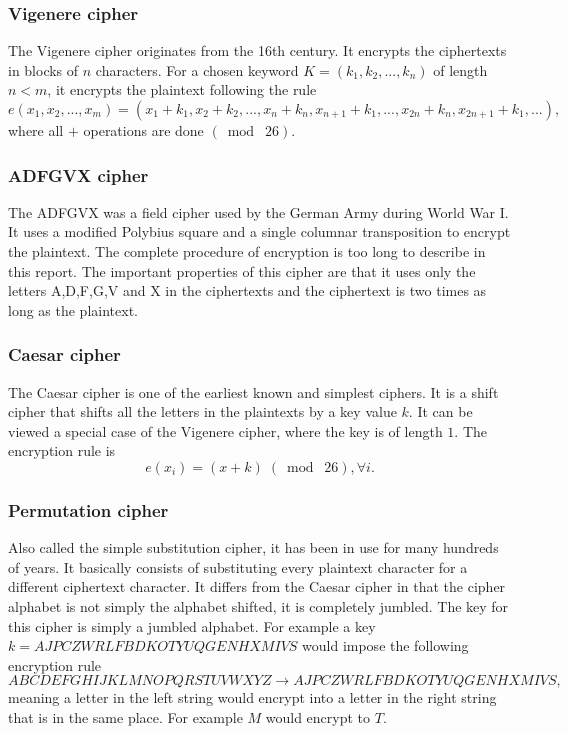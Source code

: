 \documentclass[a4paper]{article}
\begin{document}

\subsubsection{Vigenere cipher}
The Vigenere cipher originates from the 16th century. It encrypts the ciphertexts in blocks of $n$ characters. For a chosen keyword $K = (k_{1}, k_{2}, ..., k_{n})$ of length $n < m$, it encrypts the plaintext following the rule
$$e(x_{1}, x_{2}, ...,x_{m}) = (x_{1}+k_{1}, x_{2}+k_{2}, ..., x_{n}+k_{n}, x_{n+1}+k_{1}, ...,x_{2n}+k_{n}, x_{2n+1} + k_{1}, ...),$$
where all $+$ operations are done $(\bmod\; 26)$.

\subsubsection{ADFGVX cipher}
The ADFGVX was a field cipher used by the German Army during World War I. It uses a modified Polybius square and a single columnar transposition to encrypt the plaintext. The complete procedure of encryption is too long to describe in this report. The important properties of this cipher are that it uses only the letters A,D,F,G,V and X in the ciphertexts and the ciphertext is two times as long as the plaintext. 

\subsubsection{Caesar cipher}
The Caesar cipher is one of the earliest known and simplest ciphers. It is a shift cipher that shifts all the letters in the plaintexts by a key value $k$. It can be viewed a special case of the Vigenere cipher, where the key is of length $1$. The encryption rule is
$$e(x_{i}) = (x + k) \;(\bmod\; 26), \forall i.$$

\subsubsection{Permutation cipher}
Also called the simple substitution cipher, it has been in use for many hundreds of years. It basically consists of substituting every plaintext character for a different ciphertext character. It differs from the Caesar cipher in that the cipher alphabet is not simply the alphabet shifted, it is completely jumbled. The key for this cipher is simply a jumbled alphabet. For example a key $k = AJPCZWRLFBDKOTYUQGENHXMIVS$ would impose the following encryption rule
$$ABCDEFGHIJKLMNOPQRSTUVWXYZ \rightarrow AJPCZWRLFBDKOTYUQGENHXMIVS,$$
meaning a letter in the left string would encrypt into a letter in the right string that is in the same place. For example $M$ would encrypt to $T$.
\end{document}
